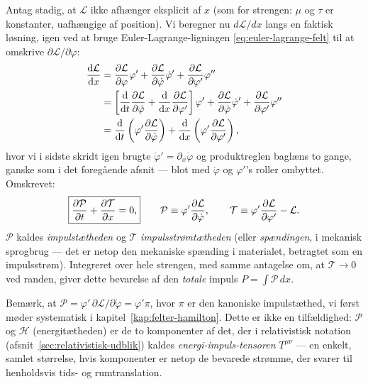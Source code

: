 Antag stadig, at $\mathcal{L}$ ikke afhænger eksplicit af $x$ (som for
strengen: $\mu$ og $\tau$ er konstanter, uafhængige af position). Vi
beregner nu $d\mathcal{L}/dx$ langs en faktisk løsning, igen ved at
bruge Euler-Lagrange-ligningen \eqref{eq:euler-lagrange-felt} til at
omskrive $\partial\mathcal{L}/\partial\varphi$:
\begin{align}
  \dv{\mathcal{L}}{x} &= \pdv{\mathcal{L}}{\varphi}\varphi'
    + \pdv{\mathcal{L}}{\dot\varphi}\dot\varphi' + \pdv{\mathcal{L}}{\varphi'}\varphi'' \\
  &= \left[\dv{}{t}\pdv{\mathcal{L}}{\dot\varphi} + \dv{}{x}\pdv{\mathcal{L}}{\varphi'}\right]\varphi'
    + \pdv{\mathcal{L}}{\dot\varphi}\dot\varphi' + \pdv{\mathcal{L}}{\varphi'}\varphi'' \\
  &= \dv{}{t}\left(\varphi'\pdv{\mathcal{L}}{\dot\varphi}\right)
    + \dv{}{x}\left(\varphi'\pdv{\mathcal{L}}{\varphi'}\right),
\end{align}
hvor vi i sidste skridt igen brugte $\dot\varphi'=\partial_x\dot\varphi$
og produktreglen baglæns to gange, ganske som i det foregående afsnit
— blot med $\dot\varphi$ og $\varphi'$'s roller ombyttet. Omskrevet:
\begin{equation}
  \boxed{\pdv{\mathcal{P}}{t} + \pdv{\mathcal{T}}{x} = 0,}
  \qquad
  \mathcal{P} \equiv \varphi'\pdv{\mathcal{L}}{\dot\varphi},
  \qquad
  \mathcal{T} \equiv \varphi'\pdv{\mathcal{L}}{\varphi'} - \mathcal{L}.
  \label{eq:impuls-kontinuitet}
\end{equation}
$\mathcal{P}$ kaldes \emph{impulstætheden} og $\mathcal{T}$
\emph{impulsstrømtætheden} (eller \emph{spændingen}, i mekanisk
sprogbrug — det er netop den mekaniske spænding i materialet, betragtet
som en impulsstrøm). Integreret over hele strengen, med samme
antagelse om, at $\mathcal{T}\to0$ ved randen, giver dette bevarelse af
den \emph{totale} impuls $P=\int\mathcal{P}\,dx$.

\begin{bemaerkning}
Bemærk, at $\mathcal{P}=\varphi'\,\partial\mathcal{L}/\partial\dot\varphi
= \varphi'\pi$, hvor $\pi$ er den kanoniske impulstæthed, vi først
møder systematisk i kapitel~\ref{kap:felter-hamilton}. Dette er ikke
en tilfældighed: $\mathcal{P}$ og $\mathcal{H}$ (energitætheden) er de
to komponenter af det, der i relativistisk notation
(afsnit~\ref{sec:relativistisk-udblik}) kaldes
\emph{energi-impuls-tensoren} $T^{\mu\nu}$ — en enkelt, samlet
størrelse, hvis komponenter er netop de bevarede strømme, der svarer
til henholdsvis tids- og rumtranslation.
\end{bemaerkning}

